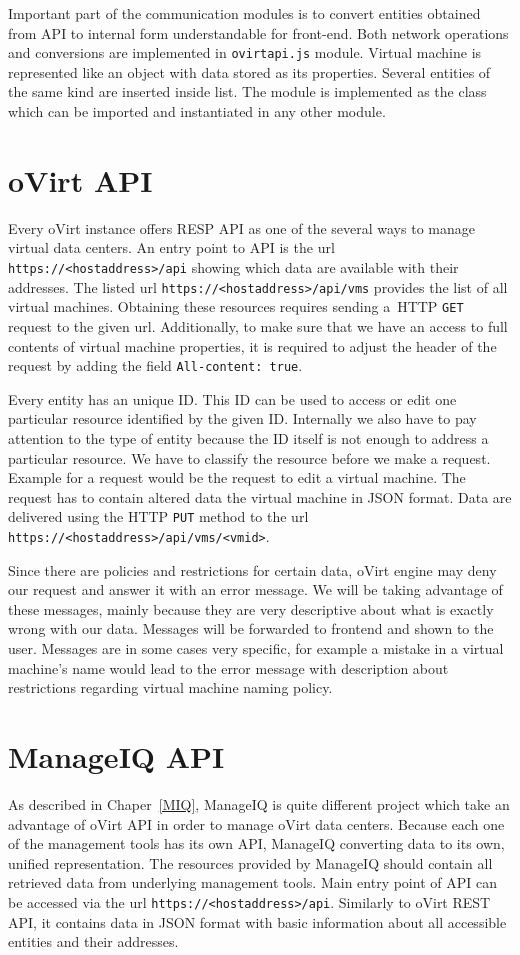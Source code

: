 Important part of the communication modules is to convert entities obtained from API to internal form understandable for front-end. Both network operations and conversions are implemented in \texttt{ovirtapi.js} module. Virtual machine is represented like an object with data stored as its properties. Several entities of the same kind are inserted inside list. The module is implemented as the class which can be imported and instantiated in any other module.

\section{oVirt API}
Every oVirt instance offers RESP API as one of the several ways to manage virtual data centers. An entry point to API is the url \texttt{https://<hostaddress>/api} showing which data are available with their addresses. The listed url \texttt{https://<hostaddress>/api/vms} provides the list of all virtual machines. Obtaining these resources requires sending a~HTTP \texttt{GET} request to the given url. Additionally, to make sure that we have an access to full contents of virtual machine properties, it is required to adjust the header of the request by adding the field \texttt{All-content: true}.

Every entity has an unique ID. This ID can be used to access or edit one particular resource identified by the given ID. Internally we also have to pay attention to the type of entity because the ID itself is not enough to address a particular resource. We have to classify the resource before we make a request. Example for a request would be the request to edit a virtual machine. The request has to contain altered data the virtual machine in JSON format. Data are delivered using the HTTP \texttt{PUT} method to the url \texttt{https://<hostaddress>/api/vms/<vmid>}.

Since there are policies and restrictions for certain data, oVirt engine may deny our request and answer it with an error message. We will be taking advantage of these messages, mainly because they are very descriptive about what is exactly wrong with our data. Messages will be forwarded to frontend and shown to the user. Messages are in some cases very specific, for example a mistake in a virtual machine's name would lead to the error message with description about restrictions regarding virtual machine naming policy. 

\section{ManageIQ API}\label{miq}
As described in Chaper~\ref{MIQ}, ManageIQ is quite different project which take an advantage of oVirt API in order to manage oVirt data centers. Because each one of the management tools has its own API, ManageIQ converting data to its own, unified representation. The resources provided by ManageIQ should contain all retrieved data from underlying management tools.
Main entry point of API can be accessed via the url \texttt{https://<hostaddress>/api}. Similarly to oVirt REST API, it contains data in JSON format with basic information about all accessible entities and their addresses. 

